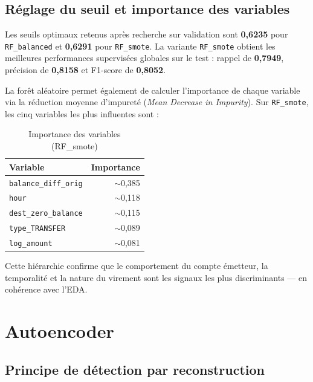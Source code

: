\subsection{Réglage du seuil et importance des variables}

Les seuils optimaux retenus après recherche sur validation sont \textbf{0,6235} pour
\texttt{RF\_balanced} et \textbf{0,6291} pour \texttt{RF\_smote}. La variante
\texttt{RF\_smote} obtient les meilleures performances supervisées globales sur le test :
rappel de \textbf{0,7949}, précision de \textbf{0,8158} et F1-score de \textbf{0,8052}.

La forêt aléatoire permet également de calculer l'importance de chaque variable via la
réduction moyenne d'impureté (\textit{Mean Decrease in Impurity}). Sur
\texttt{RF\_smote}, les cinq variables les plus influentes sont :

\begin{table}[H]
\centering
\caption{Importance des variables (RF\_smote)}
\label{tab:feature_importance_rf}
\begin{tabular}{lr}
\toprule
\textbf{Variable} & \textbf{Importance} \\
\midrule
\texttt{balance\_diff\_orig}       & $\sim$0,385 \\
\texttt{hour}                      & $\sim$0,118 \\
\texttt{dest\_zero\_balance}       & $\sim$0,115 \\
\texttt{type\_TRANSFER}            & $\sim$0,089 \\
\texttt{log\_amount}               & $\sim$0,081 \\
\bottomrule
\end{tabular}
\end{table}

Cette hiérarchie confirme que le comportement du compte émetteur, la temporalité et la
nature du virement sont les signaux les plus discriminants --- en cohérence avec l'EDA.

\section{Autoencoder}

\subsection{Principe de détection par reconstruction}

